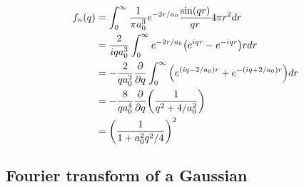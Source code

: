 \documentclass[11pt]{article}
\begin{document}
\begin{align}
f_n(q)  &= \int_0^\infty \frac{1}{\pi a_0^3}e^{-2r/a_0}   \frac{\sin(qr)}{qr}  4\pi r^2 dr \\
&= \frac{2}{ i q a_0^3}\int_0^\infty e^{-2r/a_0} \qty(e^{iqr} - e^{-iqr})    r dr \\
&= -\frac{2}{q a_0^3}\pdv{q}\int_0^\infty\qty( e^{(iq-2/a_0)r} + e^{-(iq+2/a_0)r})     dr \\
&= -\frac{8}{q a_0^4}\pdv{q} \qty( \frac{1}{q^2+4/a_0^2} )     \\
&= \qty( \frac{1}{1+a_0^2q^2/4} )^2     \\
\end{align}

\subsection{Fourier transform of a Gaussian}
\label{sec:gaussianft}
\end{document}
